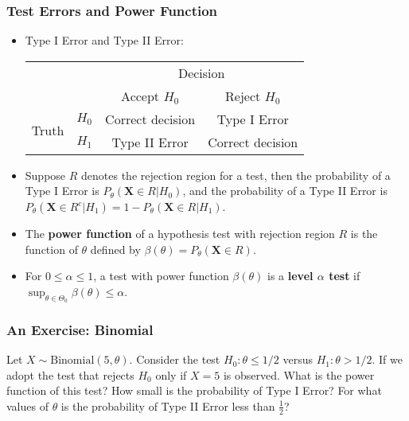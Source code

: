 \documentclass{beamer}
\begin{document}
\begin{frame}
\frametitle{Test Errors and Power Function}
\begin{itemize}
\item Type I Error and Type II Error:
\begin{table}
\centering
\begin{tabular}{cc|c|c|}
\toprule
 &  & \multicolumn{2}{|c|}{Decision}\\
 &  & Accept $H_0$ & Reject $H_0$ \\
\hline 
\multirow{2}{*}{Truth} & $H_0$ & Correct decision & Type I Error\\
\cline{3-4}
 & $H_1$ & Type II Error & Correct decision\\
\bottomrule
\end{tabular}
\end{table}
\item Suppose $R$ denotes the rejection region for a test, then the probability of a Type I Error is $P_{\theta}(\mathbf{X}\in R|H_0)$, and the probability of a Type II Error is $P_{\theta}(\mathbf{X}\in R^c|H_1)=1-P_{\theta}(\mathbf{X}\in R|H_1)$.
\item The \textbf{power function} of a hypothesis test with rejection region $R$ is the function of $\theta$ defined by $\beta(\theta)= P_{\theta}(\mathbf{X}\in R)$.
\item For $0\leq \alpha \leq 1$, a test with power function $\beta(\theta)$ is a \textbf{level $\alpha$ test} if $\sup_{\theta \in \Theta_0} \beta(\theta) \leq \alpha$.
\end{itemize}
\end{frame}

\begin{frame}
\frametitle{An Exercise: Binomial}
Let $X \sim \text{Binomial}(5,\theta)$. Consider the test $H_0: \theta \leq 1/2$ versus $H_1: \theta > 1/2$. If we adopt the test that rejects $H_0$ only if $X=5$ is observed. What is the power function of this test? How small is the probability of Type I Error? For what values of $\theta$ is the probability of Type II Error less than $\frac{1}{2}$?
\\~\\
\end{frame}
\end{document}
